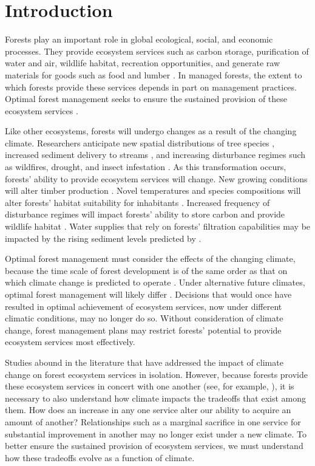 
\section{Introduction}
 
Forests play an important role in global ecological, social, and economic processes. They provide ecosystem services such as carbon storage, purification of water and air, wildlife habitat, recreation opportunities, and generate raw materials for goods such as food and lumber \cite{daily1997ecosystem}. In managed forests, the extent to which forests provide these services depends in part on management practices. Optimal forest management seeks to ensure the sustained provision of these ecosystem services \cite{cfrForestMgmt}.

Like other ecosystems, forests will undergo changes as a result of the changing climate. Researchers anticipate new spatial distributions of tree species \cite{iverson1998predicting}, increased sediment delivery to streams \cite{Goode20121}, and increasing disturbance regimes such as wildfires, drought, and insect infestation \cite{vose2012effects}. As this transformation occurs, forests' ability to provide ecosystem services will change. New growing conditions will alter timber production \cite{forschungsanstalten2009adaptation}. Novel temperatures and species compositions will alter forests' habitat suitability for inhabitants \cite{harding1997ecosystem}. Increased frequency of disturbance regimes will impact forests' ability to store carbon \cite{bonan2008forests} and provide wildlife habitat \cite{mckenzie2004climatic}. Water supplies that rely on forests' filtration capabilities may be impacted by the rising sediment levels predicted by \cite{Goode20121}.

Optimal forest management must consider the effects of the changing climate, because the time scale of forest development is of the same order as that on which climate change is predicted to operate \cite{ipcc2013climate}. Under alternative future climates, optimal forest management will likely differ \cite{linder2000developing}. Decisions that would once have resulted in optimal achievement of ecosystem services, now under different climatic conditions, may no longer do so. Without consideration of climate change, forest management plans may restrict forests' potential to provide ecosystem services most effectively.

Studies abound in the literature that have addressed the impact of climate change on forest ecosystem services in isolation. However, because forests provide these ecosystem services in concert with one another (see, for example, \cite{toth2009finding}), it is necessary to also understand how climate impacts the tradeoffs that exist among them. How does an increase in any one service alter our ability to acquire an amount of another? Relationships such as a marginal sacrifice in one service for substantial improvement in another may no longer exist under a new climate. To better ensure the sustained provision of ecosystem services, we must understand how these tradeoffs evolve as a function of climate.

